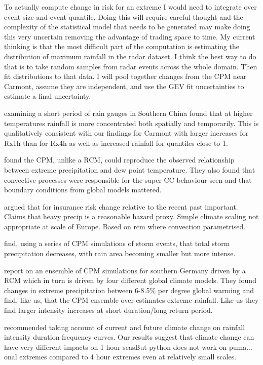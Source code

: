 \documentclass[11pt,a4paper]{article}
\begin{document}
 
 To actually  compute change in risk for an extreme I would need to integrate over event size and event quantile. Doing this will require careful thought and the complexity of the statistical model  that needs to be generated may make doing this very uncertain removing the advantage of trading space to time.  My current thinking is that the most difficult part of the computation is estimating the distribution of maximum rainfall in the radar dataset. I think the best way to do that is to take random samples from radar events across the whole domain. Then fit distributions to that data.  I will pool together changes from the CPM near Carmont, assume they are independent, and use the GEV fit  uncertainties to estimate a final uncertainty. 

   \cite{long2021rainfall_conc} examining a short period of rain gauges in Southern China found that at higher temperatures rainfall is more concentrated both spatially and temporarily. This is qualitatively consistent with our findings for Carmont with larger increases for Rx1h than for Rx4h as well as increased rainfall for quantiles close to 1.

\cite{Lee2022CPM_Korea} found the CPM, unlike a RCM, could reproduce the observed relationship between extreme precipitation and dew point temperature. They also found that convective processes were responsible for the super CC behaviour seen and that boundary conditions from global models mattered. 

\cite{lang2024catmodels} argued that for insurance risk change relative to the recent past important. Claims that heavy precip is a reasonable hazard proxy. Simple climate scaling not appropriate at scale of Europe. Based on  rcm where convection parametrised.

\cite{Moshe2022extremes} find, using a series of CPM simulations  of storm events, that total storm precipitation decreases, with rain area becoming smaller but more intense. 

\cite{hundhausen2024extreme_precip} report on an ensemble of CPM simulations for southern Germany driven by a RCM which in turn is driven by four different global climate models. They found changes in extreme precipitation between 6-8.5\% per degree global warming and find, like us, that the CPM ensemble over estimates extreme rainfall. Like us they find larger intensity increases at short duration/long return period.  

\cite{martel2021rainfall_ifd} recommended taking account of current and future climate change on rainfall intensity duration frequency curves. Our results suggest that climate change can have very different impacts on 1 hour seasBut python does not work on puma... onal extremes compared to 4 hour extremes even at relatively small scales. 
\end{document}
